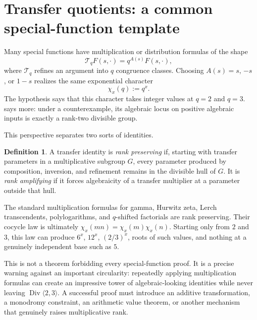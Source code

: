\documentclass[11pt]{article}
\numberwithin{equation}{section}
\theoremstyle{definition}
\newtheorem{definition}[theorem]{Definition}
\theoremstyle{remark}
\newcommand{\Div}{\operatorname{Div}}
\begin{document}
\section{Transfer quotients: a common special-function template}
\label{sec:transfer}

Many special functions have multiplication or distribution formulas of the shape
\begin{equation}
 \mathcal T_q F(s,\cdot)=q^{A(s)}F(s,\cdot),
 \label{eq:transfer-template}
\end{equation}
where $\mathcal T_q$ refines an argument into $q$ congruence classes.  Choosing $A(s)=s$, $-s$, or $1-s$ realizes the same exponential character
\begin{equation}
 \chi_x(q):=q^x.
 \label{eq:character}
\end{equation}
The hypothesis says that this character takes integer values at $q=2$ and $q=3$.   says more: under a counterexample, its algebraic locus on positive algebraic inputs is exactly a rank-two divisible group.

This perspective separates two sorts of identities.

\begin{definition}
A transfer identity is \emph{rank preserving} if, starting with transfer parameters in a multiplicative subgroup $G$, every parameter produced by composition, inversion, and refinement remains in the divisible hull of $G$.  It is \emph{rank amplifying} if it forces algebraicity of a transfer multiplier at a parameter outside that hull.
\end{definition}

The standard multiplication formulas for gamma, Hurwitz zeta, Lerch transcendents, polylogarithms, and $q$-shifted factorials are rank preserving.  Their cocycle law is ultimately $\chi_x(mn)=\chi_x(m)\chi_x(n)$.  Starting only from $2$ and $3$, this law can produce $6^x$, $12^x$, $(2/3)^x$, roots of such values, and nothing at a genuinely independent base such as $5$.

This is not a theorem forbidding every special-function proof.  It is a precise warning against an important circularity: repeatedly applying multiplication formulas can create an impressive tower of algebraic-looking identities while never leaving $\Div\langle2,3\rangle$.  A successful proof must introduce an additive transformation, a monodromy constraint, an arithmetic value theorem, or another mechanism that genuinely raises multiplicative rank.
\end{document}
